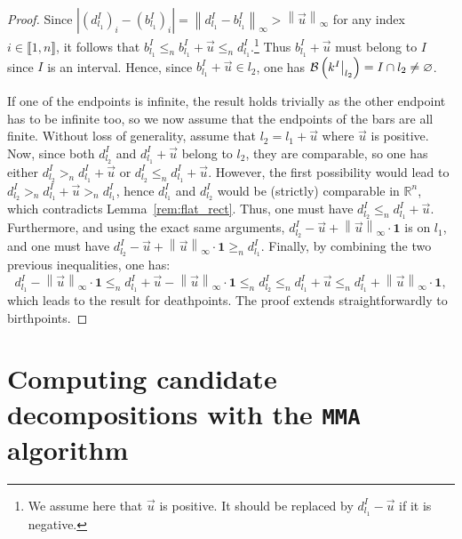 \documentclass{article}
\newcommand{\field}{k}
\newcommand{\norm}[1]{\left\lVert #1 \right\rVert}
\newcommand{\barcode}[1]{ {\mathcal B}\left(#1\right) }
\newcommand{\induced}[1]{\field^{#1}}
\newcommand{\R}{\mathbb{R}}
\newcommand{\leqn}{\leq_n}
\newcommand{\geqn}{\geq_n}
\newcommand{\sgn}{>_n}
\newcommand\restr[2]{{  \left.\kern-\nulldelimiterspace #1 \vphantom{\big|} \right|_{#2}  }}
\DeclareRobustCommand*{\ora}{\overrightarrow}
\newcommand{\MMA}{\texttt{MMA}}
\newcommand{\mmaout}{candidate}
\newcommand{\rebuttal}[1]{{ #1}}
\begin{document}
\begin{proof}

	 Since $|(d^I_{l_1})_i - (b^I_{l_1})_i| =
	\norm{d^I_{l_1} - b^I_{l_1}}_\infty > \norm{\ora u }_\infty$ for any index
	$i\in\llbracket 1,n \rrbracket$, it follows that $b^I_{l_1}\leqn
	b^I_{l_1}+\ora u \leqn d^I_{l_1}$.\footnote{We assume here that
	$\ora u$ is positive. It should be replaced by $d_{l_1}^I - \ora u$ if it is negative.} Thus $b^I_{l_1}+\ora u$ must belong to ${I}$ since $I$ is
	an interval. Hence, since $b^I_{l_1}+\ora u \in l_2$, one has
	$\barcode{\restr{\rebuttal{\induced I}}{l_2}} = {I}\cap l_2 \neq\varnothing$.

	 If one of the endpoints is infinite, the result
	holds trivially as the other endpoint has to be infinite too, so we now assume that the endpoints of the bars are all finite.
	Without loss of generality, %
	assume that $l_2 = l_1 + \ora u$ where $\ora u$ is positive.
	Now, since both $d_{l_2}^I$ and $d_{l_1}^I + \ora u$ belong to $l_2$, they are comparable, so one has either $d_{l_2}^I \sgn d_{l_1}^I + \ora u$ or $d_{l_2}^I \leqn d_{l_1}^I + \ora u$.
	However, the first possibility would lead to  $d_{l_2}^I \sgn d_{l_1}^I + \ora u \sgn d_{l_1}^I$, hence $d_{l_1}^I$ and $d_{l_2}^I$ would be (strictly) comparable in $\R^n$,
	which contradicts Lemma~\ref{rem:flat_rect}.
	Thus, one must have $d_{l_2}^I \leqn d_{l_1}^I + \ora u$.
	Furthermore, and using the exact same arguments, $d^I_{l_2} - \ora u + \norm{ \ora u}_{\infty} \cdot \boldsymbol 1$ is on $l_1$, and one must have
	$d_{l_2}^I - \ora u +\norm{ \ora u}_{\infty} \cdot \boldsymbol 1 \geqn d_{l_1}^I$. %
	Finally, by combining the two previous inequalities, one has:
	\begin{equation*}
		d_{l_1}^I - \norm{ \ora u}_{\infty} \cdot \textbf{1}
		\leqn d_{l_1}^I + \ora u - \norm{ \ora u}_{\infty} \cdot \textbf{1}
		\leqn
		d_{l_2}^I
		\leqn
		d_{l_1}^I + \ora u
		\leqn
		d_{l_1}^I + \norm{ \ora u}_{\infty} \cdot \textbf{1},
	\end{equation*}
	which leads to the result for deathpoints. The proof extends straightforwardly to birthpoints. %
\end{proof}






\section{\rebuttal{Computing \mmaout{} decompositions with the \MMA{} algorithm}}
\label{sec:candidates}
\end{document}
